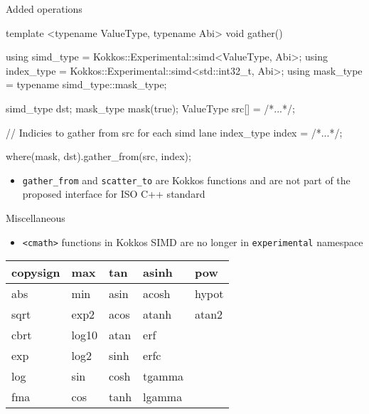 \begin{frame}[fragile]{Added operations}

\begin{code}[keywords={GatherFrom}]

template <typename ValueType, typename Abi>
void gather() {
  using simd_type = Kokkos::Experimental::simd<ValueType, Abi>;
  using index_type = Kokkos::Experimental::simd<std::int32_t, Abi>;
  using mask_type = typename simd_type::mask_type;
  
  simd_type dst;
  mask_type mask(true);
  ValueType src[] = /*...*/;

  // Indicies to gather from src for each simd lane
  index_type index = /*...*/;

  where(mask, dst).gather_from(src, index);
}
\end{code}

\begin{itemize}
  \item \texttt{gather\_from} and \texttt{scatter\_to} are Kokkos functions
and are not part of the proposed interface for ISO C++ standard
\end{itemize}

\end{frame}


\begin{frame}[fragile]{Miscellaneous}

\begin{itemize}
  \item \texttt{<cmath>} functions in Kokkos SIMD are no longer in \texttt{experimental} namespace
\end{itemize}

\begin{table}[]
\begin{tabular}{|l|l|l|l|l|}
\hline
copysign & max   & tan  & asinh  & pow   \\ \hline
abs      & min   & asin & acosh  & hypot \\ \hline
sqrt     & exp2  & acos & atanh  & atan2 \\ \hline
cbrt     & log10 & atan & erf    &       \\ \hline
exp      & log2  & sinh & erfc   &       \\ \hline
log      & sin   & cosh & tgamma &       \\ \hline
fma      & cos   & tanh & lgamma &       \\ \hline
\end{tabular}
\end{table}

\end{frame}

